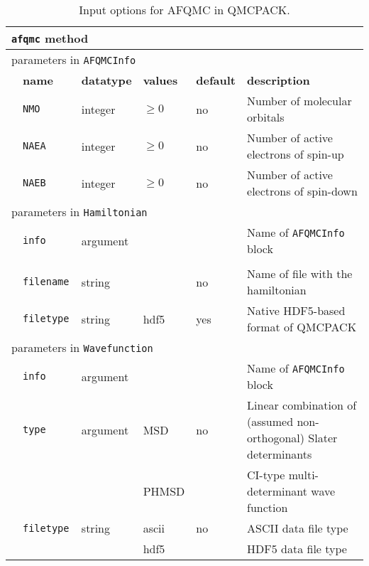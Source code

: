 \begin{table}[h]
\begin{center}
\caption{Input options for AFQMC in QMCPACK.\label{table:afqmc_basic}}
\begin{tabularx}{\textwidth}{l l l l l X }
\hline
\multicolumn{6}{l}{\texttt{afqmc} method} \\
\hline
\multicolumn{6}{l}{parameters in \texttt{AFQMCInfo}} \\
   &   \bfseries name     & \bfseries datatype & \bfseries values & \bfseries default   & \bfseries description \\
   &   \texttt{NMO             } &  integer     & $\ge 0$ & no & Number of molecular orbitals \\
   &   \texttt{NAEA            } &  integer     & $\ge 0$ & no & Number of active electrons of spin-up \\
   &   \texttt{NAEB            } &  integer     & $\ge 0$ & no & Number of active electrons of spin-down \\
\multicolumn{6}{l}{parameters in \texttt{Hamiltonian}}  \\
   &   \texttt{info            } &  argument   &               &      & Name of \texttt{AFQMCInfo} block \\\\
   &   \texttt{filename        } &  string     &               & no   & Name of file with the hamiltonian \\
   &   \texttt{filetype        } &  string     & hdf5          & yes  & Native HDF5-based format of QMCPACK  \\ 
\multicolumn{6}{l}{parameters in \texttt{Wavefunction}}\\
   &   \texttt{info            } &  argument   &             &      & Name of \texttt{AFQMCInfo} block \\
   &   \texttt{type            } &  argument & MSD      & no   & Linear combination of (assumed non-orthogonal) Slater determinants \\
   &   \texttt{                } &           & PHMSD &    & CI-type multi-determinant wave function  \\
   &   \texttt{filetype        } &  string  & ascii       & no   & ASCII data file type \\
   &   \texttt{                } &          & hdf5        &      & HDF5 data file type \\

\end{tabularx}
\end{center}
\end{table}
